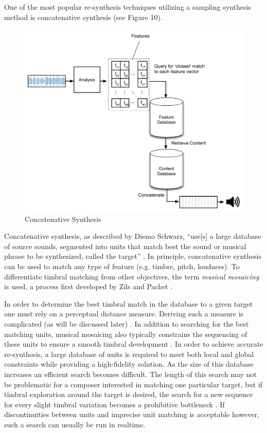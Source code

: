 \documentclass[12pt]{report} 	%
\numberwithin{figure}{chapter}
\numberwithin{table}{chapter}
\numberwithin{equation}{chapter}
\begin{document}
\begin{flushleft}
One of the most popular re-synthesis techniques utilizing a sampling synthesis method is concatenative synthesis (see Figure 10). 
\begin{figure}[h!]
\begin{center}
\includegraphics[scale=0.55]{ConcatSynth}
\caption[Concatenative synthesis]{Concatenative Synthesis}
\end{center}
\vspace{6pt}
\end{figure}
Concatenative synthesis, as described by Diemo Schwarz, ``use[s] a large database of source sounds, segmented into units that match best the sound or musical phrase to be synthesized, called the target'' \cite[p. 1]{Schwarz:2006gr}. In principle, concatenative synthesis can be used to match any type of feature (e.g. timbre, pitch, loudness). To differentiate timbral matching from other objectives, the term \textit{musical mosaicing} is used, a process first developed by Zils and Pachet \cite{Zils:2001bd}. 

In order to determine the best timbral match in the database to a given target one must rely on a perceptual distance measure. Deriving such a measure is complicated (as will be discussed later) \cite[p. 13]{Schwarz:2006gr}. In addition to searching for the best matching units, musical mosaicing also typically constrains the sequencing of these units to ensure a smooth timbral development \cite[p. 1]{Zils:2001bd}. In order to achieve accurate re-synthesis, a large database of units is required to meet both local and global constraints while providing a high-fidelity solution. As the size of this database increases an efficient search becomes difficult. The length of this search may not be problematic for a composer interested in matching one particular target, but if timbral exploration around the target is desired, the search for a new sequence for every slight timbral variation becomes a prohibitive bottleneck \cite[p. 11]{Schwarz:2006gr}.  If discontinuities between units and imprecise unit matching is acceptable however, such a search can usually be run in realtime.


\end{flushleft}
\end{document}
